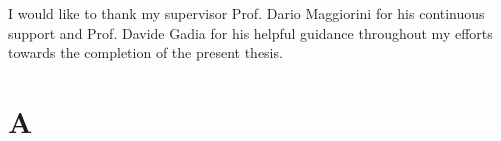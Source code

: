 \documentclass[english]{report}
\begin{document}
%
%
I would like to thank my supervisor Prof. Dario Maggiorini for his continuous support and Prof. Davide Gadia for his helpful guidance throughout my efforts towards the completion of the present thesis.

%
%

\afterpreface

















% 
% 

\appendix

\chapter{A}


%
%



\end{document}
